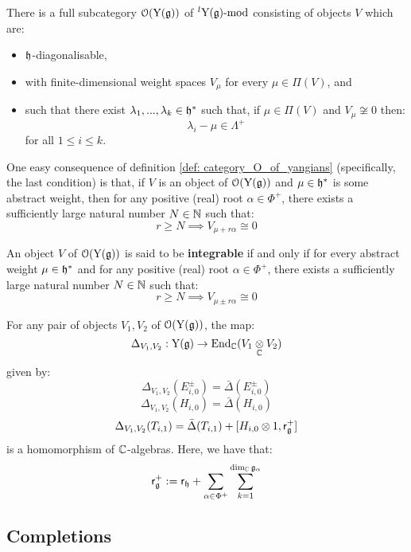         \begin{definition} \label{def: category_O_of_yangians}
            There is a full subcategory $\mathcal{O}(\mathrm{Y}(\mathfrak{g}))$ of ${}^l\mathrm{Y}(\mathfrak{g})\text{-}\mathrm{mod}$ consisting of objects $V$ which are:
            \begin{itemize}
                \item $\mathfrak{h}$-diagonalisable,
                \item with finite-dimensional weight spaces $V_{\mu}$ for every $\mu \in \Pi(V)$, and
                \item such that there exist $\lambda_1, ..., \lambda_k \in \mathfrak{h}^*$ such that, if $\mu \in \Pi(V)$ and $V_{\mu} \not \cong 0$ then:
                    $$\lambda_i - \mu \in \Lambda^+$$
                for all $1 \leq i \leq k$.
            \end{itemize}
        \end{definition}
        \begin{remark}
            One easy consequence of definition \ref{def: category_O_of_yangians} (specifically, the last condition) is that, if $V$ is an object of $\mathcal{O}(\mathrm{Y}(\mathfrak{g}))$ and $\mu \in \mathfrak{h}^*$ is some abstract weight, then for any positive (real) root $\alpha \in \Phi^+$, there exists a sufficiently large natural number $N \in \mathbb{N}$ such that:
                $$r \geq N \implies V_{\mu + r \alpha} \cong 0$$
        \end{remark}
        \begin{definition} \label{def: integrable_modules_over_yangians}
            An object $V$ of $\mathcal{O}(\mathrm{Y}(\mathfrak{g}))$ is said to be \textbf{integrable} if and only if for every abstract weight $\mu \in \mathfrak{h}^*$ and for any positive (real) root $\alpha \in \Phi^+$, there exists a sufficiently large natural number $N \in \mathbb{N}$ such that:
                $$r \geq N \implies V_{\mu \pm r \alpha} \cong 0$$
        \end{definition}

        \begin{theorem} \label{theorem: tensor_products_in_the_category_O_of_yangians}
            \cite[Theorem 4.9]{guay_nakajima_wendlandt_affine_yangian_coproduct} For any pair of objects $V_1, V_2$ of $\mathcal{O}(\mathrm{Y}(\mathfrak{g}))$, the map:
                $$\Delta_{V_1, V_2}: \rmY(\g) \to \End_{\bbC}(V_1 \tensor_{\bbC} V_2)$$
            given by:
                $$\Delta_{V_1, V_2}(E_{i, 0}^{\pm}) = \bar{\Delta}(E_{i, 0}^{\pm})$$
                $$\Delta_{V_1, V_2}(H_{i, 0}) = \bar{\Delta}(H_{i, 0})$$
                $$\Delta_{V_1, V_2}(T_{i, 1}) = \bar{\Delta}(T_{i, 1}) + [H_{i, 0} \tensor 1, \sfr_{\g}^+]$$
            is a homomorphism of $\mathbb{C}$-algebras. Here, we have that:
                $$\mathsf{r}_{\mathfrak{g}}^+ := \mathsf{r}_{\mathfrak{h}} + \sum_{\alpha \in \Phi^+} \sum_{k = 1}^{\dim_{\mathbb{C}} \mathfrak{g}_{\alpha}} $$
        \end{theorem}
    
    \subsection{Completions}